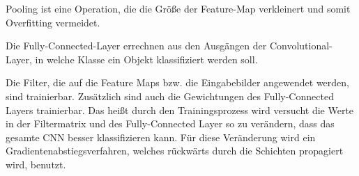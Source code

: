 Pooling ist eine Operation, die die Größe der Feature-Map verkleinert und somit Overfitting vermeidet.

Die Fully-Connected-Layer errechnen aus den Ausgängen der Convolutional-Layer, in welche Klasse ein Objekt klassifiziert werden soll.  

Die Filter, die auf die Feature Maps bzw. die Eingabebilder angewendet werden, sind trainierbar. Zusätzlich sind auch die Gewichtungen des Fully-Connected Layers trainierbar. Das heißt durch den Trainingsprozess wird versucht die Werte in der Filtermatrix und des Fully-Connected Layer so zu verändern, dass das gesamte CNN besser klassifizieren kann. Für diese Veränderung wird ein Gradientenabstiegsverfahren, welches rückwärts durch die Schichten propagiert wird, benutzt.
